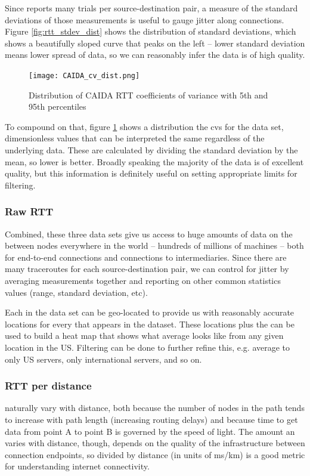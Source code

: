 Since \caida reports many trials per source-destination pair, a measure of the standard deviations of those measurements is useful to gauge jitter along connections. Figure \ref{fig:rtt_stdev_dist} shows the distribution of standard deviations, which shows a beautifully sloped curve that peaks on the left -- lower standard deviation means lower spread of data, so we can reasonably infer the data is of high quality.

\begin{figure}[H]
    \centering
    \texttt{[image: CAIDA\_cv\_dist.png]}
    \caption{Distribution of CAIDA RTT coefficients of variance with 5th and 95th percentiles} 
    \label{fig:rtt_cv_dst}
\end{figure}

To compound on that, figure \ref{fig:rtt_cv_dst} shows a distribution the \glspl{cv} for the data set, dimensionless values that can be interpreted the same regardless of the underlying data. These are calculated by dividing the standard deviation by the mean, so lower is better. Broadly speaking the majority of the data is of excellent quality, but this information is definitely useful on setting appropriate limits for filtering.

\subsubsection{Raw RTT}
Combined, these three data sets give us access to huge amounts of data on the \rtts between nodes everywhere in the world -- hundreds of millions of machines -- both for end-to-end connections and connections to intermediaries. Since there are many traceroutes for each source-destination pair, we can control for jitter by averaging measurements together and reporting on other common statistics values (range, standard deviation, etc).

Each \ip in the data set can be geo-located to provide us with reasonably accurate locations for every \ip that appears in the dataset. These locations plus the \rtts can be used to build a heat map that shows what average \rtt looks like from any given location in the US. Filtering can be done to further refine this, e.g. average \rtt to only US servers, only international servers, and so on.

\subsubsection{RTT per distance}
\rtts naturally vary with distance, both because the number of nodes in the path tends to increase with path length (increasing routing delays) and because time to get data from point A to point B is governed by the speed of light. The amount an \rtt varies with distance, though, depends on the quality of the infrastructure between connection endpoints, so \rtt divided by distance (in units of ms/km) is a good metric for understanding internet connectivity.

